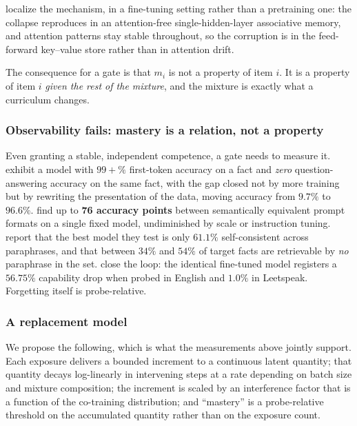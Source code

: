 \documentclass[11pt]{article}
\theoremstyle{plain}
\theoremstyle{definition}
\theoremstyle{remark}
\begin{document}
\citet{zucchet2025} localize the mechanism, in a fine-tuning setting rather
than a pretraining one: the collapse reproduces in an attention-free
single-hidden-layer associative memory, and attention patterns stay stable
throughout, so the corruption is in the feed-forward key--value store rather than
in attention drift.

The consequence for a gate is that $m_i$ is not a property of item $i$. It is a
property of item $i$ \emph{given the rest of the mixture}, and the mixture is
exactly what a curriculum changes.

\subsubsection{Observability fails: mastery is a relation, not a property}

Even granting a stable, independent competence, a gate needs to measure it.
\citet{allenzhu2024storage} exhibit a model with $99{+}\%$ first-token accuracy on
a fact and \emph{zero} question-answering accuracy on the same fact, with the gap
closed not by more training but by rewriting the presentation of the data, moving
accuracy from $9.7\%$ to $96.6\%$. \citet{sclar2024quantifying} find up to
\textbf{76 accuracy points} between semantically equivalent prompt formats on a
single fixed model, undiminished by scale or instruction tuning.
\citet{elazar2021measuring} report that the best model they test is only $61.1\%$
self-consistent across paraphrases, and that between $34\%$ and $54\%$ of target
facts are retrievable by \emph{no} paraphrase in the set. \citet{kotha2024understanding}
close the loop: the identical fine-tuned model registers a $56.75\%$ capability
drop when probed in English and $1.0\%$ in Leetspeak. Forgetting itself is
probe-relative.

\subsubsection{A replacement model}

We propose the following, which is what the measurements above jointly support.
Each exposure delivers a bounded increment to a continuous latent quantity; that
quantity decays log-linearly in intervening steps at a rate depending on batch
size and mixture composition; the increment is scaled by an interference factor
that is a function of the co-training distribution; and ``mastery'' is a
probe-relative threshold on the accumulated quantity rather than on the exposure
count.
\end{document}

